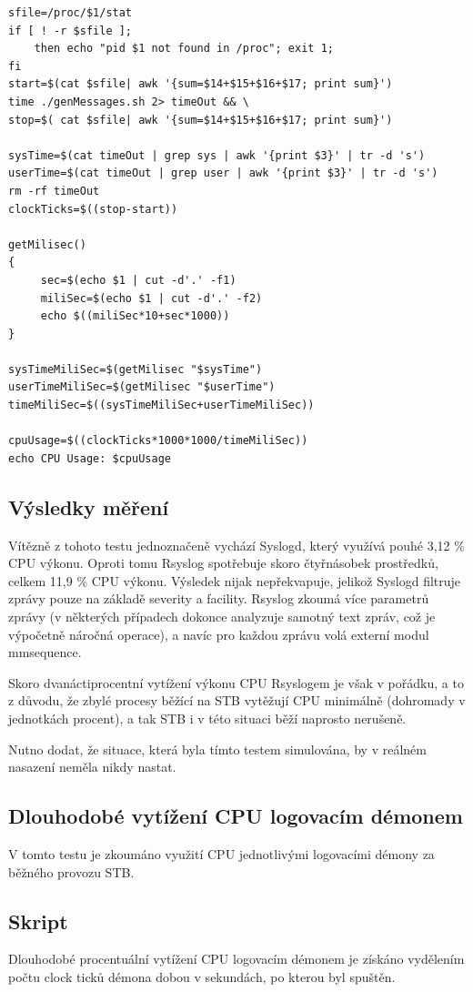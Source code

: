 \documentclass[thesis=B,czech]{FITthesis}[2012/06/26]
\begin{document}
\begin{lstlisting}[style=AshStyle]
sfile=/proc/$1/stat
if [ ! -r $sfile ];
	then echo "pid $1 not found in /proc"; exit 1;
fi
start=$(cat $sfile| awk '{sum=$14+$15+$16+$17; print sum}')
time ./genMessages.sh 2> timeOut && \
stop=$( cat $sfile| awk '{sum=$14+$15+$16+$17; print sum}')

sysTime=$(cat timeOut | grep sys | awk '{print $3}' | tr -d 's')
userTime=$(cat timeOut | grep user | awk '{print $3}' | tr -d 's')
rm -rf timeOut
clockTicks=$((stop-start))

getMilisec()
{
	 sec=$(echo $1 | cut -d'.' -f1)
	 miliSec=$(echo $1 | cut -d'.' -f2)
	 echo $((miliSec*10+sec*1000))
}

sysTimeMiliSec=$(getMilisec "$sysTime")
userTimeMiliSec=$(getMilisec "$userTime")
timeMiliSec=$((sysTimeMiliSec+userTimeMiliSec))

cpuUsage=$((clockTicks*1000*1000/timeMiliSec))
echo CPU Usage: $cpuUsage
\end{lstlisting}

\subsection*{Výsledky měření}
Vítězně z tohoto testu jednoznačeně vychází Syslogd, který využívá pouhé 3,12 \% CPU výkonu. Oproti tomu Rsyslog spotřebuje skoro čtyřnásobek prostředků, celkem 11,9 \% CPU výkonu.
Výsledek nijak nepřekvapuje, jelikož Syslogd filtruje zprávy pouze na základě severity a facility. Rsyslog zkoumá více parametrů zprávy (v některých případech dokonce analyzuje samotný text zpráv, což je výpočetně náročná operace), a navíc pro každou zprávu volá externí modul mmsequence.

Skoro dvanáctiprocentní vytížení výkonu CPU Rsyslogem je však v pořádku, a to z důvodu, že zbylé procesy běžící na STB vytěžují CPU minimálně (dohromady v jednotkách  procent), a tak STB i v této situaci běží naprosto nerušeně.

Nutno dodat, že situace, která byla tímto testem simulována, by v reálném nasazení neměla nikdy nastat.

\subsection{Dlouhodobé vytížení CPU logovacím démonem}
V tomto testu je zkoumáno využití CPU jednotlivými logovacími démony za běžného provozu STB.

\subsection*{Skript}
Dlouhodobé procentuální vytížení CPU logovacím démonem je získáno vydělením počtu clock ticků démona dobou v sekundách, po kterou byl spuštěn.
\end{document}
